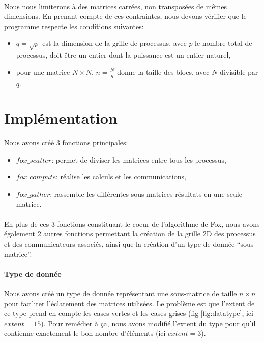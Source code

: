 \documentclass[12pt]{article}
\begin{document}
\paragraph{}Nous nous limiterons à des matrices carrées, non transposées de mêmes dimensions. En prenant compte de ces contraintes, nous devons vérifier que le programme respecte les conditions suivantes:
\begin{itemize}
\item $q=\sqrt{p}$ est la dimension de la grille de processus, avec $p$ le nombre total de processus, doit être un entier dont la puissance est un entier naturel,
\item pour une matrice $N \times N$, $n= \frac{N}{q} $ donne la taille des blocs, avec $N$ divisible par $q$.
\end{itemize}

\section{Implémentation} \label{s:impl}
Nous avons créé 3 fonctions principales:
\begin{itemize}
\item $fox\_scatter$: permet de diviser les matrices entre tous les processus,
\item $fox\_compute$: réalise les calculs et les communications,
\item $fox\_gather$: rassemble les différentes sous-matrices résultats en une seule matrice.
\end{itemize}

\paragraph{}
En plus de ces 3 fonctions constituant le coeur de l'algorithme de Fox, nous avons également 2 autres fonctions permettant la création de la grille 2D des processus et des communicateurs associés, ainsi que la création d'un type de donnée ``sous-matrice''.

\paragraph{Type de donnée}
Nous avons créé un type de donnée représentant une sous-matrice de taille $n\times n$ pour faciliter l'éclatement des matrices utilisées. Le problème est que l'extent de ce type prend en compte les cases vertes et les cases grises (fig \ref{fig:datatype}, ici $extent = 15$). Pour remédier à ça, nous avons modifié l'extent du type pour qu'il contienne exactement le bon nombre d'éléments (ici $extent = 3$). 
\end{document}
